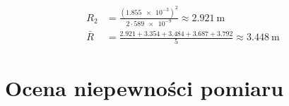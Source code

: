 \documentclass[a4paper,12pt]{article}
\begin{document}
\begin{align*}
    R_2     & = \frac{(\num{1.855e-3})^2}{2 \cdot \num{589e-9}}  \approx \SI{2.921}{\meter}                              \\
    \bar{R} & = \frac{\num{2.921} + \num{3.354} + \num{3.484} + \num{3.687} + \num{3.792}}{5} \approx \SI{3.448}{\meter}
\end{align*}

\section{Ocena niepewności pomiaru}





\end{document}
